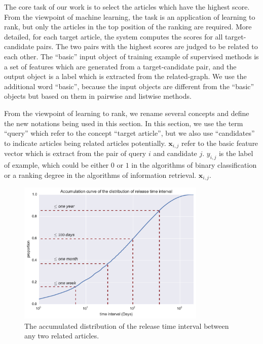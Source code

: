 The core task of our work is to select the articles which have the highest score. From the viewpoint of machine learning, the task is an application of learning to rank, but only the articles in the top position of the ranking are required. More detailed, for each target article, the system computes the scores for all target-candidate pairs. The two pairs with the highest scores are judged to be related to each other. The ``basic'' input object of training example of supervised methods is a set of features which are generated from a target-candidate pair, and the output object is a label which is extracted from the related-graph. We use the additional word ``basic'', because the input objects are different from the ``basic'' objects but based on them in pairwise and listwise methods. 

From the viewpoint of learning to rank, we rename several concepts and define the new notations being used in this section. In this section, we use the term ``query'' which refer to the concept ``target article'', but we also use ``candidates'' to indicate articles being related articles potentially. $\mathbf{x}_{i, j}$ refer to the basic feature vector which is extract from the pair of query $i$ and candidate $j$. $y_{i,j}$ is the label of example, which could be either $0$ or $1$ in the algorithms of binary classification or a ranking degree in the algorithms of information retrieval. $\mathbf{x}_{i,j}$. 

\begin{figure}[!htb]
    \centering
    \includegraphics[width=0.8\textwidth]{fig/release_related}
    \caption{The accumulated distribution of the release time interval between any two related articles. }
    \label{fig:release_relate}
\end{figure}

